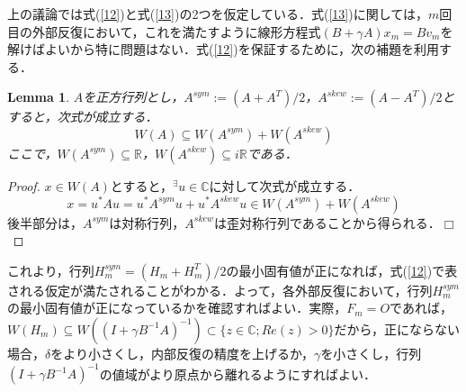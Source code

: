 \documentclass[a4paper,12pt]{nodlabpabw}
\newtheorem{lem}{Lemma}[chapter]
\newtheorem{proof}{Proof:}
\begin{document}
上の議論では式(\ref{12})と式(\ref{13})の2つを仮定している．式(\ref{13})に関しては，$m$回目の外部反復において，これを満たすように線形方程式$(B+\gamma A)x_m=Bv_m$を解けばよいから特に問題はない．式(\ref{12})を保証するために，次の補題を利用する．
\begin{lem}
$A$を正方行列とし，$A^{sym}:=(A+A^T)/2$，$A^{skew}:=(A-A^T)/2$とすると，次式が成立する．
\begin{equation}
W(A)\subseteq W(A^{sym})+W(A^{skew})\nonumber
\end{equation}
ここで，$W(A^{sym})\subseteq\mathbb{R}$，$W(A^{skew})\subseteq i\mathbb{R}$である．
\end{lem}
\begin{proof}
$x\in W(A)$とすると，$^{\exists} u\in\mathbb{C}$に対して次式が成立する．
\begin{equation}
x=u^*Au=u^*A^{sym}u+u^*A^{skew}u\in W(A^{sym})+W(A^{skew})\nonumber
\end{equation}
後半部分は，$A^{sym}$は対称行列，$A^{skew}$は歪対称行列であることから得られる．$\Box$
\end{proof}
これより，行列$H^{sym}_m=(H_m+H_m^T)/2$の最小固有値が正になれば，式(\ref{12})で表される仮定が満たされることがわかる．よって，各外部反復において，行列$H^{sym}_m$の最小固有値が正になっているかを確認すればよい．実際，$F_m=O$であれば，$W(H_m)\subseteq W((I+\gamma B^{-1}A)^{-1})\subset\{z\in\mathbb{C};Re(z)>0\}$だから，正にならない場合，$\delta$をより小さくし，内部反復の精度を上げるか，$\gamma$を小さくし，行列$(I+\gamma B^{-1}A)^{-1}$の値域がより原点から離れるようにすればよい．
\end{document}
